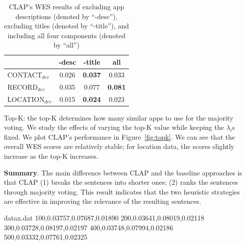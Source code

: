 \begin{table}
\centering
\caption{CLAP's WES results of excluding app descriptions  (denoted by ``-desc''), excluding titles (denoted by ``-title''), and including all four components (denoted by ``all'')\label{tab:lambda}}
\begin{tabular}{p{1.8cm}||c||c||c}
\hline
  & -desc & -title & all\\ \hline
\textsf{CONTACT}$_{dev}$ & 0.026 &  \textbf{0.037} & 0.033 \\ 
\textsf{RECORD}$_{dev}$ & 0.035  & 0.077  &  \textbf{0.081} \\ 
\textsf{LOCATION}$_{dev}$ & 0.015 & \textbf{0.024}  & 0.023 \\ \hline
\end{tabular}
\end{table} 

{Top-K}: the top-K determines how many similar apps to use for the majority voting. 
We study the effects of varying the top-K value while keeping the $\lambda_i$s fixed. 
We plot CLAP's performance in Figure~\ref{fig:topk}. 
We can see that the overall WES scores are relatively stable; for location data, the scores slightly increase as the top-K increases.

\textbf{Summary}. 
The main difference between CLAP and the baseline approaches is that CLAP 
(1) breaks the sentences into shorter ones; 
(2) ranks the sentences through majority voting.
This result indicates that the two heuristic strategies are effective in improving the relevance of the resulting sentences. 

\begin{filecontents}{datax.dat}
100,0.03757,0.07687,0.01890
200,0.03641,0.08019,0.02118
300,0.03728,0.08197,0.02197
400,0.03748,0.07994,0.02186
500,0.03332,0.07761,0.02325
\end{filecontents}

